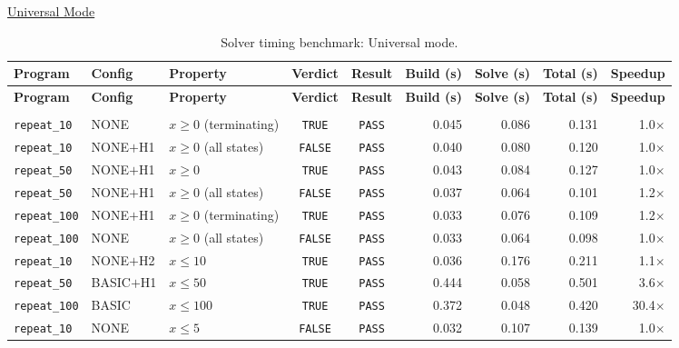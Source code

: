 \underline{Universal Mode}

{\small
\begin{longtable}{p{} p{} p{} c c r r r r}
\caption{Solver timing benchmark: Universal mode.}
\label{tab:timing-universal} \\
\toprule
\textbf{Program} & \textbf{Config} & \textbf{Property} & \textbf{Verdict} & \textbf{Result} & \textbf{Build (s)} & \textbf{Solve (s)} & \textbf{Total (s)} & \textbf{Speedup} \\
\midrule
\endfirsthead
\toprule
\textbf{Program} & \textbf{Config} & \textbf{Property} & \textbf{Verdict} & \textbf{Result} & \textbf{Build (s)} & \textbf{Solve (s)} & \textbf{Total (s)} & \textbf{Speedup} \\
\midrule
\endhead
\midrule
\endfoot
\bottomrule
\endlastfoot
\multicolumn{9}{l}{\textit{Universal mode -- Loop Scaling}} \\
\midrule
\texttt{repeat\_10} & NONE & $x \geq 0$ (terminating) & \texttt{TRUE} & \texttt{PASS} & 0.045 & 0.086 & 0.131 & 1.0$\times$ \\
\texttt{repeat\_10} & NONE$+$H1 & $x \geq 0$ (all states) & \texttt{FALSE} & \texttt{PASS} & 0.040 & 0.080 & 0.120 & 1.0$\times$ \\
\texttt{repeat\_50} & NONE$+$H1 & $x \geq 0$ & \texttt{TRUE} & \texttt{PASS} & 0.043 & 0.084 & 0.127 & 1.0$\times$ \\
\texttt{repeat\_50} & NONE$+$H1 & $x \geq 0$ (all states) & \texttt{FALSE} & \texttt{PASS} & 0.037 & 0.064 & 0.101 & 1.2$\times$ \\
\texttt{repeat\_100} & NONE$+$H1 & $x \geq 0$ (terminating) & \texttt{TRUE} & \texttt{PASS} & 0.033 & 0.076 & 0.109 & 1.2$\times$ \\
\texttt{repeat\_100} & NONE & $x \geq 0$ (all states) & \texttt{FALSE} & \texttt{PASS} & 0.033 & 0.064 & 0.098 & 1.0$\times$ \\
\texttt{repeat\_10} & NONE$+$H2 & $x \leq 10$ & \texttt{TRUE} & \texttt{PASS} & 0.036 & 0.176 & 0.211 & 1.1$\times$ \\
\texttt{repeat\_50} & BASIC$+$H1 & $x \leq 50$ & \texttt{TRUE} & \texttt{PASS} & 0.444 & 0.058 & 0.501 & 3.6$\times$ \\
\texttt{repeat\_100} & BASIC & $x \leq 100$ & \texttt{TRUE} & \texttt{PASS} & 0.372 & 0.048 & 0.420 & 30.4$\times$ \\
\texttt{repeat\_10} & NONE & $x \leq 5$ & \texttt{FALSE} & \texttt{PASS} & 0.032 & 0.107 & 0.139 & 1.0$\times$ \\

\end{longtable}}
